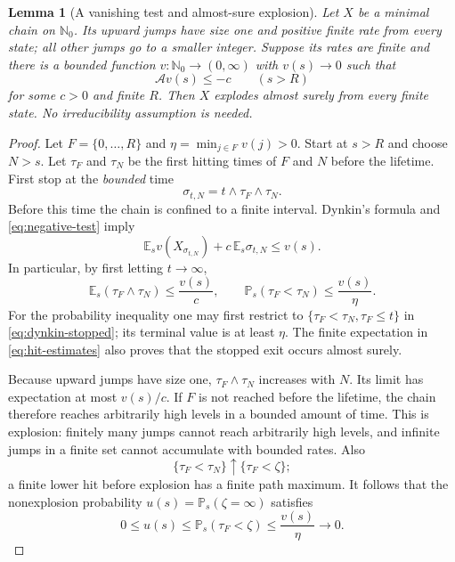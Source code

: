 \documentclass[11pt,a4paper]{article}
\newtheorem{lemma}[theorem]{Lemma}
\theoremstyle{remark}\newtheorem{remark}[theorem]{Remark}
\newcommand{\Nzero}{\mathbb N_0}
\newcommand{\E}{\mathbb E}
\newcommand{\Prob}{\mathbb P}
\newcommand{\A}{\mathcal A}
\begin{document}
\begin{lemma}[A vanishing test and almost-sure explosion]\label{lem:explosion}
Let $X$ be a minimal chain on $\Nzero$. Its upward jumps have size one and positive finite rate from every state; all other jumps go to a smaller integer. Suppose its rates are finite and there is a bounded function $v:\Nzero\to(0,\infty)$ with $v(s)\to0$ such that
\begin{equation}\label{eq:negative-test}
\A v(s)\le-c\qquad(s>R)
\end{equation}
for some $c>0$ and finite $R$. Then $X$ explodes almost surely from every finite state. No irreducibility assumption is needed.
\end{lemma}
\begin{proof}
Let $F=\{0,\ldots,R\}$ and $\eta=\min_{j\in F}v(j)>0$. Start at $s>R$ and choose $N>s$. Let $\tau_F$ and $\tau_N$ be the first hitting times of $F$ and $N$ before the lifetime. First stop at the \emph{bounded} time
\[
\sigma_{t,N}=t\wedge\tau_F\wedge\tau_N.
\]
Before this time the chain is confined to a finite interval. Dynkin's formula and \eqref{eq:negative-test} imply
\begin{equation}\label{eq:dynkin-stopped}
\E_s v(X_{\sigma_{t,N}})+c\,\E_s\sigma_{t,N}\le v(s).
\end{equation}
In particular, by first letting $t\to\infty$,
\begin{equation}\label{eq:hit-estimates}
\E_s(\tau_F\wedge\tau_N)\le\frac{v(s)}c,\qquad
\Prob_s(\tau_F<\tau_N)\le\frac{v(s)}\eta.
\end{equation}
For the probability inequality one may first restrict to
$\{\tau_F<\tau_N,\tau_F\le t\}$ in \eqref{eq:dynkin-stopped}; its terminal value is at least $\eta$. The finite expectation in \eqref{eq:hit-estimates} also proves that the stopped exit occurs almost surely.

Because upward jumps have size one, $\tau_F\wedge\tau_N$ increases with $N$. Its limit has expectation at most $v(s)/c$. If $F$ is not reached before the lifetime, the chain therefore reaches arbitrarily high levels in a bounded amount of time. This is explosion: finitely many jumps cannot reach arbitrarily high levels, and infinite jumps in a finite set cannot accumulate with bounded rates. Also
\[
\{\tau_F<\tau_N\}\uparrow\{\tau_F<\zeta\};
\]
a finite lower hit before explosion has a finite path maximum. It follows that the nonexplosion probability $u(s)=\Prob_s(\zeta=\infty)$ satisfies
\begin{equation}\label{eq:survival-bound}
0\le u(s)\le\Prob_s(\tau_F<\zeta)\le\frac{v(s)}\eta
\longrightarrow0.
\end{equation}


\end{proof}
\end{document}

